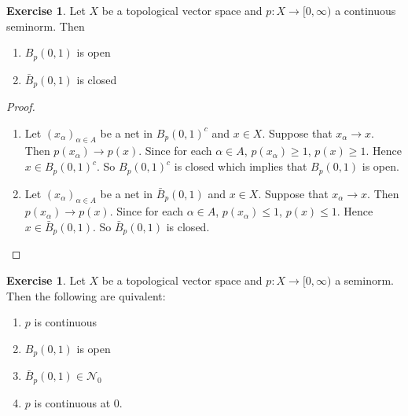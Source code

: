 \documentclass[12pt]{amsart}
\theoremstyle{definition}
\newtheorem{ex}[definition]{Exercise}
\newcommand{\al}{\alpha}
\newcommand{\MN}{\mathcal{N}}
\newcommand{\Rg}{[0,\infty)}
\DeclareMathOperator*{\0}{\mbf{0}}
\DeclareMathOperator*{\1}{\mbf{1}}
\begin{document}
	\begin{ex}
		Let $X$ be a topological vector space and $p:X \rightarrow \Rg$ a continuous seminorm. Then 
		\begin{enumerate}
			\item $B_p(0,1)$ is open 
			\item $\bar{B}_p(0,1)$ is closed
		\end{enumerate}
	\end{ex}

	\begin{proof}\
		\begin{enumerate}
			\item Let $(x_{\al})_{\al \in A}$ be a net in $B_p(0,1)^c$ and $x \in X$. Suppose that $x_{\al} \rightarrow x$. Then $p(x_{\al}) \rightarrow p(x)$. Since for each $\al \in A$, $p(x_{\al}) \geq 1$, $p(x) \geq 1$. Hence $x \in B_p(0,1)^c$. So $B_p(0,1)^c$ is closed which implies that $B_p(0,1)$ is open.
			\item Let $(x_{\al})_{\al \in A}$ be a net in $\bar{B}_p(0,1)$ and $x \in X$. Suppose that $x_{\al} \rightarrow x$. Then $p(x_{\al}) \rightarrow p(x)$. Since for each $\al \in A$, $p(x_{\al}) \leq 1$, $p(x) \leq 1$. Hence $x \in \bar{B}_p(0,1)$. So $\bar{B}_p(0,1)$ is closed.
		\end{enumerate}
	\end{proof}

	\begin{ex}
		Let $X$ be a topological vector space and $p:X \rightarrow \Rg$ a seminorm. Then the following are quivalent:
		\begin{enumerate}
			\item $p$ is continuous
			\item $B_p(0,1)$ is open
			\item $\bar{B}_p(0,1) \in \MN_0$ 
			\item $p$ is continuous at $0$. 
		\end{enumerate}
	\end{ex}
\end{document}
